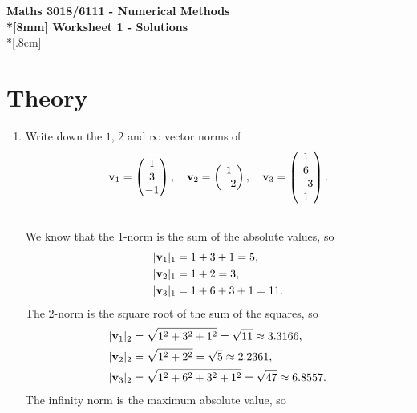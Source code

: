 \documentclass[10pt]{article}
\begin{document}
\thispagestyle{empty}
\begin{center}
\textbf{\Large Maths 3018/6111 - Numerical Methods \\*[8mm]
Worksheet 1 - Solutions}\\*[.8cm]
\end{center}

\section*{Theory}

\begin{enumerate}
\item Write down the $1$, $2$ and $\infty$ vector norms of
  \begin{equation*}
    {\bf v}_1 =
    \begin{pmatrix}
      1 \\ 3 \\ -1
    \end{pmatrix}, \quad
    {\bf v}_2 =
    \begin{pmatrix}
      1 \\ -2
    \end{pmatrix}, \quad
    {\bf v}_3 =
    \begin{pmatrix}
      1 \\ 6 \\ -3 \\ 1
    \end{pmatrix}.
  \end{equation*}
  \begin{center}
    \rule{0.9\textwidth}{.1pt}
  \end{center}  
  We know that the 1-norm is the sum of the absolute values, so
  \begin{align*}
    |{\bf v}_1|_1 & = 1 + 3 + 1 = 5, \\
    |{\bf v}_2|_1 & = 1 + 2  = 3, \\
    |{\bf v}_3|_1 & = 1 + 6 + 3 + 1 = 11.
  \end{align*}
  The 2-norm is the square root of the sum of the squares, so
  \begin{align*}
    |{\bf v}_1|_2 & = \sqrt{1^2 + 3^2 + 1^2} = \sqrt{11} \approx 3.3166, \\
    |{\bf v}_2|_2 & = \sqrt{1^2 + 2^2}  = \sqrt{5} \approx 2.2361, \\
    |{\bf v}_3|_2 & = \sqrt{1^2 + 6^2 + 3^2 + 1^2} = \sqrt{47} \approx
    6.8557.
  \end{align*}
  The infinity norm is the maximum absolute value, so

\end{enumerate}
\end{document}

